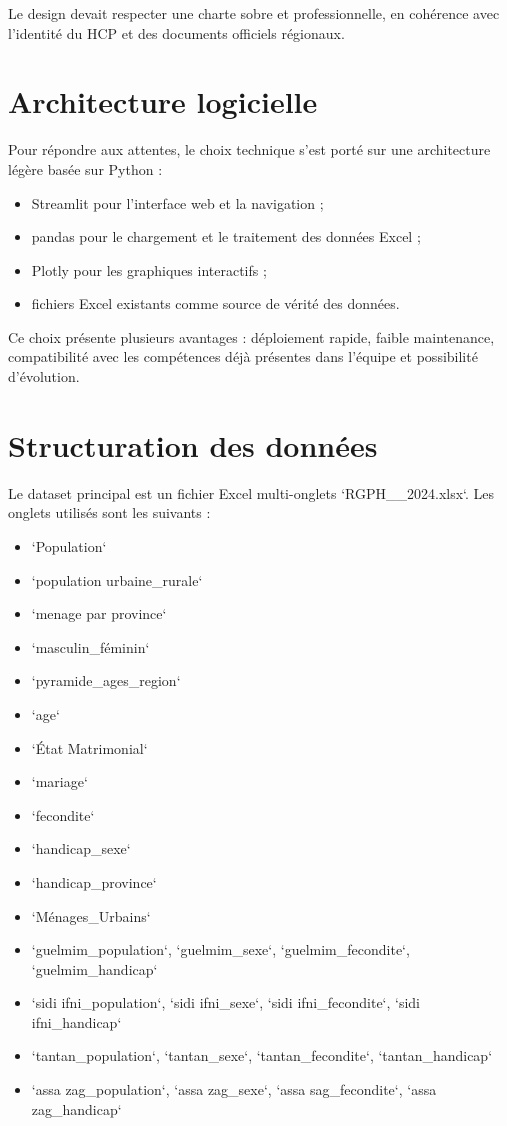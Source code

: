 \documentclass[12pt,a4paper,oneside]{report}
\begin{document}
Le design devait respecter une charte sobre et professionnelle, en cohérence avec l'identité du HCP et des documents officiels régionaux.

\section{Architecture logicielle}

Pour répondre aux attentes, le choix technique s'est porté sur une architecture légère basée sur Python :

\begin{itemize}[leftmargin=*]
  \item Streamlit pour l'interface web et la navigation ;
  \item pandas pour le chargement et le traitement des données Excel ;
  \item Plotly pour les graphiques interactifs ;
  \item fichiers Excel existants comme source de vérité des données.
\end{itemize}

Ce choix présente plusieurs avantages : déploiement rapide, faible maintenance, compatibilité avec les compétences déjà présentes dans l'équipe et possibilité d'évolution.

\section{Structuration des données}

Le dataset principal est un fichier Excel multi-onglets `RGPH__2024.xlsx`. Les onglets utilisés sont les suivants :

\begin{itemize}[leftmargin=*]
  \item `Population`
  \item `population urbaine_rurale`
  \item `menage par province`
  \item `masculin_féminin`
  \item `pyramide_ages_region`
  \item `age`
  \item `État Matrimonial`
  \item `mariage`
  \item `fecondite`
  \item `handicap_sexe`
  \item `handicap_province`
  \item `Ménages_Urbains`
  \item `guelmim_population`, `guelmim_sexe`, `guelmim_fecondite`, `guelmim_handicap`
  \item `sidi ifni_population`, `sidi ifni_sexe`, `sidi ifni_fecondite`, `sidi ifni_handicap`
  \item `tantan_population`, `tantan_sexe`, `tantan_fecondite`, `tantan_handicap`
  \item `assa zag_population`, `assa zag_sexe`, `assa sag_fecondite`, `assa zag_handicap`
\end{itemize}
\end{document}
